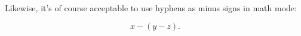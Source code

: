\documentclass{article}
\begin{document}

Likewise, it's of course acceptable to use hyphens as minus signs in math mode: 

\[x - (y - z).\]
\end{document}
